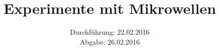 

\subject{Versuch 53}
\title{Experimente mit Mikrowellen}
\date{Durchführung: 22.02.2016\\
      Abgabe: 26.02.2016}



\maketitle
\newpage







\printbibliography


